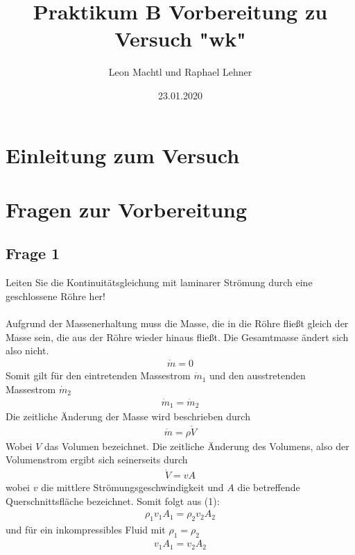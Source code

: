 \documentclass[a4paper,10pt]{scrartcl}
\title{Praktikum B Vorbereitung zu Versuch "wk"}
\author{Leon Machtl und Raphael Lehner}
\date{23.01.2020}
\begin{document}
	\maketitle
	\tableofcontents
	\newpage
	
	\section{Einleitung zum Versuch}
		
	\section{Fragen zur Vorbereitung}
		\subsection{Frage 1}
			Leiten Sie die Kontinuitätsgleichung mit laminarer Strömung durch eine geschlossene Röhre
			her!\\
			\\
			Aufgrund der Massenerhaltung muss die Masse, die in die Röhre fließt gleich der Masse sein, die aus der Röhre wieder hinaus fließt. Die Gesamtmasse ändert sich also nicht.
			\begin{align*}
			\dot m=0
			\end{align*}
			Somit gilt für den eintretenden Massestrom \(\dot m_{1}\) und den ausstretenden Massestrom \(\dot m_{2}\)
			\begin{align}
			\dot m_{1}=\dot m_{2}
			\end{align}
			Die zeitliche Änderung der Masse wird beschrieben durch 
			\begin{align*}
			\dot m=\rho \dot V
			\end{align*}
			Wobei \(V\) das Volumen bezeichnet. Die zeitliche Änderung des Volumens, also der Volumenstrom ergibt sich seinerseits durch
			\begin{align*}
			\dot V=vA
			\end{align*}
			wobei \(v\) die mittlere Strömungsgeschwindigkeit und \(A\) die betreffende Querschnittsfläche bezeichnet. Somit folgt aus (1):
			\begin{align*}
			\rho_{1}v_{1}A_{1}=\rho_{2}v_{2}A_{2}
			\end{align*}
			und für ein inkompressibles Fluid mit \(\rho_{1}=\rho_{2}\)
			\begin{align*}
			v_{1}A_{1}=v_{2}A_{2}
			\end{align*}
			
\end{document}
